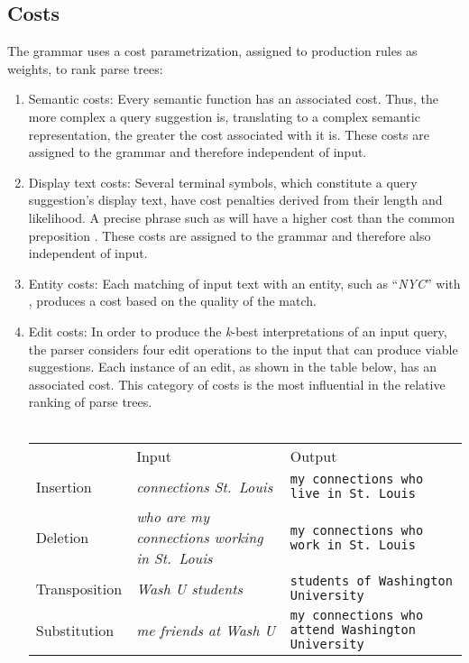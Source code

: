 \documentclass{article}
\begin{document}
\subsection{Costs}
The grammar uses a cost parametrization, assigned to production rules as weights,  to rank parse trees:
\begin{enumerate}
\item Semantic costs: Every semantic function has an associated cost. Thus, the more complex a query suggestion is, translating to a complex semantic representation, the greater the cost associated with it is. These costs are assigned to the grammar and therefore independent of input.
\item Display text costs: Several terminal symbols, which constitute a query suggestion's display text, have cost penalties derived from their length and likelihood. A precise phrase such as  will have a higher cost than the common preposition . These costs are assigned to the grammar and therefore also independent of input.
\item Entity costs: Each matching of input text with an entity, such as ``\textit{NYC}'' with \texttt{}, produces a cost based on the quality of the match.
\item Edit costs: In order to produce the \textit{k}-best interpretations of an input query, the parser considers four edit operations to the input that can produce viable suggestions. Each instance of an edit, as shown in the table below, has an associated cost. This category of costs is the most influential in the relative ranking of parse trees.\\\\
\begin{tabularx}{\linewidth}{ l X X }
& Input & Output\\
Insertion & \textit{connections St.\ Louis} & \texttt{my connections who live in St.\ Louis}\\
Deletion & \textit{who are my connections working in St.\ Louis} & \texttt{my connections who work in St.\ Louis}\\
Transposition & \textit{Wash U students} & \texttt{students of Washington University}\\
Substitution & \textit{me friends at Wash U} & \texttt{my connections who attend Washington University}
\end{tabularx}
\end{enumerate}
\end{document}
